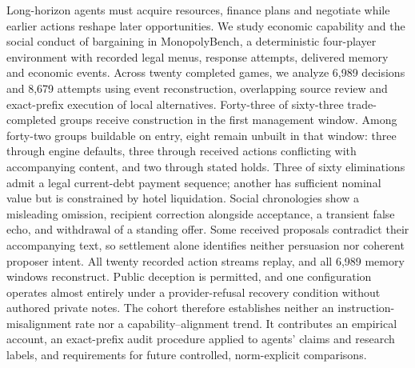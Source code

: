 Long-horizon agents must acquire resources, finance plans and negotiate while earlier actions reshape later opportunities. We study economic capability and the social conduct of bargaining in MonopolyBench, a deterministic four-player environment with recorded legal menus, response attempts, delivered memory and economic events. Across twenty completed games, we analyze 6,989 decisions and 8,679 attempts using event reconstruction, overlapping source review and exact-prefix execution of local alternatives. Forty-three of sixty-three trade-completed groups receive construction in the first management window. Among forty-two groups buildable on entry, eight remain unbuilt in that window: three through engine defaults, three through received actions conflicting with accompanying content, and two through stated holds. Three of sixty eliminations admit a legal current-debt payment sequence; another has sufficient nominal value but is constrained by hotel liquidation. Social chronologies show a misleading omission, recipient correction alongside acceptance, a transient false echo, and withdrawal of a standing offer. Some received proposals contradict their accompanying text, so settlement alone identifies neither persuasion nor coherent proposer intent. All twenty recorded action streams replay, and all 6,989 memory windows reconstruct. Public deception is permitted, and one configuration operates almost entirely under a provider-refusal recovery condition without authored private notes. The cohort therefore establishes neither an instruction-misalignment rate nor a capability--alignment trend. It contributes an empirical account, an exact-prefix audit procedure applied to agents' claims and research labels, and requirements for future controlled, norm-explicit comparisons.
